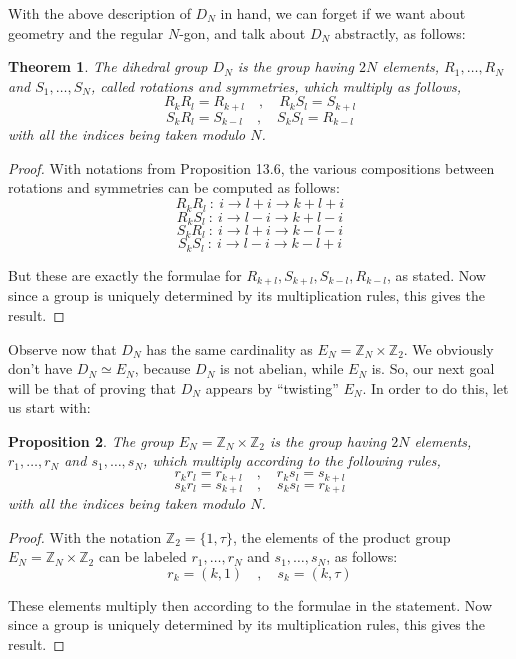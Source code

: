 \documentclass[12pt]{amsbook}
\newtheorem{theorem}{Theorem}[chapter]
\newtheorem{proposition}[theorem]{Proposition}
\begin{document}
With the above description of $D_N$ in hand, we can forget if we want about geometry and the regular $N$-gon, and talk about $D_N$ abstractly, as follows:


\begin{theorem}
The dihedral group $D_N$ is the group having $2N$ elements, $R_1,\ldots,R_N$ and $S_1,\ldots,S_N$, called rotations and symmetries, which multiply as follows,
$$R_kR_l=R_{k+l}\quad,\quad 
R_kS_l=S_{k+l}$$
$$S_kR_l=S_{k-l}\quad,\quad
S_kS_l=R_{k-l}$$
with all the indices being taken modulo $N$.
\end{theorem}

\begin{proof}
With notations from Proposition 13.6, the various compositions between rotations and symmetries can be computed as follows:
$$R_kR_l\ :\ i\to l+i\to k+l+i$$
$$R_kS_l\ :\ i\to l-i\to k+l-i$$
$$S_kR_l\ :\ i\to l+i\to k-l-i$$
$$S_kS_l\ :\ i\to l-i\to k-l+i$$

But these are exactly the formulae for $R_{k+l},S_{k+l},S_{k-l},R_{k-l}$, as stated. Now since a group is uniquely determined by its multiplication rules, this gives the result.
\end{proof}

Observe now that $D_N$ has the same cardinality as $E_N=\mathbb Z_N\times\mathbb Z_2$. We obviously don't have $D_N\simeq E_N$, because $D_N$ is not abelian, while $E_N$ is. So, our next goal will be that of proving that $D_N$ appears by ``twisting'' $E_N$. In order to do this, let us start with:

\begin{proposition}
The group $E_N=\mathbb Z_N\times\mathbb Z_2$ is the group having $2N$ elements, $r_1,\ldots,r_N$ and $s_1,\ldots,s_N$, which multiply according to the following rules,
$$r_kr_l=r_{k+l}\quad,\quad 
r_ks_l=s_{k+l}$$
$$s_kr_l=s_{k+l}\quad,\quad 
s_ks_l=r_{k+l}$$
with all the indices being taken modulo $N$.
\end{proposition}

\begin{proof}
With the notation $\mathbb Z_2=\{1,\tau\}$, the elements of the product group $E_N=\mathbb Z_N\times\mathbb Z_2$ can be labeled $r_1,\ldots,r_N$ and $s_1,\ldots,s_N$, as follows:
$$r_k=(k,1)\quad,\quad
s_k=(k,\tau)$$

These elements multiply then according to the formulae in the statement. Now since a group is uniquely determined by its multiplication rules, this gives the result.
\end{proof}
\end{document}
